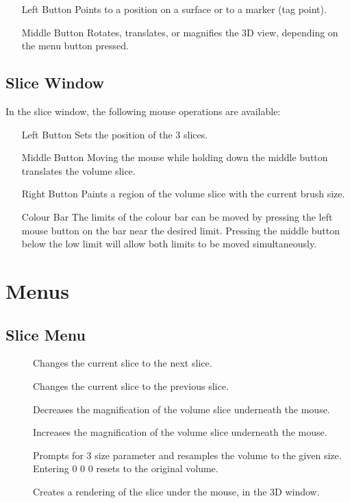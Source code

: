 \begin{itemize}
\item[Left Button]  Points to a position on a surface or to a marker
                    (tag point).
\item[Middle Button]  Rotates, translates, or magnifies the 3D view, depending
                      on the menu button pressed.
\end{itemize}

\subsection{Slice Window}

In the slice window, the following mouse operations are available:

\begin{itemize}
\item[Left Button]  Sets the position of the 3 slices.
\item[Middle Button]  Moving the mouse while holding down the middle button
                      translates the volume slice.
\item[Right Button]  Paints a region of the volume slice with the current
                     brush size.
\item[Colour Bar]  The limits of the colour bar can be moved by pressing
                   the left mouse button on the bar near the desired limit.
                   Pressing the middle button below the low limit will allow
                   both limits to be moved simultaneously.
\end{itemize}

\section{Menus}

\subsection{Slice Menu}

\begin{description}
\item[]  Changes the current slice to the next slice.
\item[]  Changes the current slice to the previous slice.
\item[]  Decreases the magnification of the
       volume slice underneath the mouse.
\item[]  Increases the magnification of the
       volume slice underneath the mouse.
\item[]  Prompts for 3 size parameter and
       resamples the volume to the given size.  Entering 0 0 0 resets to
       the original volume.
\item[]  Creates a rendering of the slice
       under the mouse, in the 3D window.
\end{description}

